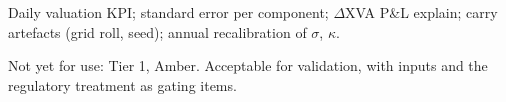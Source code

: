 \documentclass[11pt,a4paper]{article}
\begin{document}
Daily valuation KPI; standard error per component; $\Delta$XVA P\&L explain;
carry artefacts (grid roll, seed); annual recalibration of $\sigma$, $\kappa$.

Not yet for use: Tier 1, Amber. Acceptable for validation, with inputs and
the regulatory treatment as gating items.

\end{document}
